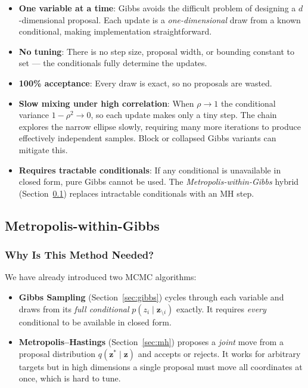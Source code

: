 \documentclass[12pt, a4paper]{article}
\begin{document}
\begin{itemize}
    \item \textbf{One variable at a time}: Gibbs avoids the
          difficult problem of designing a $d$-dimensional
          proposal.  Each update is a \emph{one-dimensional}
          draw from a known conditional, making implementation
          straightforward.
    \item \textbf{No tuning}: There is no step size, proposal
          width, or bounding constant to set --- the conditionals
          fully determine the updates.
    \item \textbf{100\% acceptance}: Every draw is exact, so no
          proposals are wasted.
    \item \textbf{Slow mixing under high correlation}: When
          $\rho \to 1$ the conditional variance
          $1 - \rho^2 \to 0$, so each update makes only a tiny
          step.  The chain explores the narrow ellipse slowly,
          requiring many more iterations to produce effectively
          independent samples.  Block or collapsed Gibbs
          variants can mitigate this.
    \item \textbf{Requires tractable conditionals}: If any
          conditional is unavailable in closed form, pure Gibbs
          cannot be used.  The \emph{Metropolis-within-Gibbs}
          hybrid (Section~\ref{sec:mwg}) replaces intractable
          conditionals with an MH step.
\end{itemize}

\subsection{Metropolis-within-Gibbs}
\label{sec:mwg}

\subsubsection{Why Is This Method Needed?}

We have already introduced two MCMC algorithms:
\begin{itemize}
    \item \textbf{Gibbs Sampling} (Section~\ref{sec:gibbs})
          cycles through each variable and draws from its
          \emph{full conditional} $p(z_i \mid \mathbf{z}_{\setminus i})$
          exactly.  It requires \emph{every} conditional to be
          available in closed form.
    \item \textbf{Metropolis--Hastings} (Section~\ref{sec:mh})
          proposes a \emph{joint} move from a proposal
          distribution $q(\mathbf{z}^* \mid \mathbf{z})$ and
          accepts or rejects.  It works for arbitrary targets
          but in high dimensions a single proposal must move all
          coordinates at once, which is hard to tune.
\end{itemize}
\end{document}
